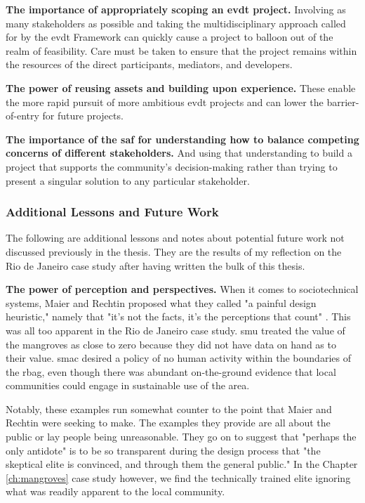\textbf{The importance of appropriately scoping an \ac{evdt} project.} Involving as many stakeholders as possible and taking the multidisciplinary approach called for by the \ac{evdt} Framework can quickly cause a project to balloon out of the realm of feasibility. Care must be taken to ensure that the project remains within the resources of the direct participants, mediators, and developers.

\textbf{The power of reusing assets and building upon experience.} These enable the more rapid pursuit of more ambitious \ac{evdt} projects and can lower the barrier-of-entry for future projects.

\textbf{The importance of the \ac{saf} for understanding how to balance competing concerns of different stakeholders.} And using that understanding to build a project that supports the community's decision-making rather than trying to present a singular solution to any particular stakeholder.

\subsubsection{Additional Lessons and Future Work}

The following are additional lessons and notes about potential future work not discussed previously in the thesis. They are the results of my reflection on the Rio de Janeiro case study after having written the bulk of this thesis.

\textbf{The power of perception and perspectives.} When it comes to sociotechnical systems, Maier and Rechtin proposed what they called "a painful design heuristic," namely that "it's not the facts, it's the perceptions that count" \cite{maierArtSystemsArchitecting2009}. This was all too apparent in the Rio de Janeiro case study. \ac{smu} treated the value of the mangroves as close to zero because they did not have data on hand as to their value. \ac{smac} desired a policy of no human activity within the boundaries of the \ac{rbag}, even though there was abundant on-the-ground evidence that local communities could engage in sustainable use of the area. 

Notably, these examples run somewhat counter to the point that Maier and Rechtin were seeking to make. The examples they provide are all about the public or lay people being unreasonable. They go on to suggest that "perhaps the only antidote" is to be so transparent during the design process that "the skeptical elite is convinced, and through them the general public." In the Chapter \ref{ch:mangroves} case study however, we find the technically trained elite ignoring what was readily apparent to the local community. 

